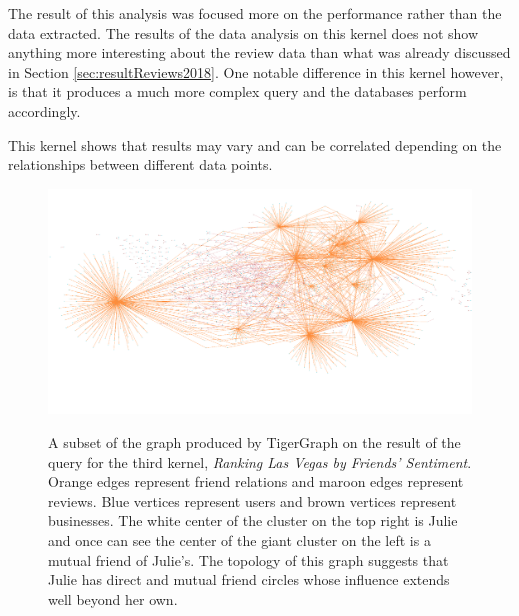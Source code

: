 The result of this analysis was focused more on the performance rather than the data extracted. The results of the data analysis on this kernel does not show anything more interesting about the review data than what was already discussed in Section \ref{sec:resultReviews2018}. One notable difference in this kernel however, is that it produces a much more complex query and the databases perform accordingly.

This kernel shows that results may vary and can be correlated depending on the relationships between different data points.

\begin{figure}[h]
    \centering
    \begin{mdframed}[backgroundcolor=gray!70!white, style=GraphFrame]
    {\includegraphics[width=\textwidth]{img/7_graphs/julieBusinesses.png}}
    \end{mdframed}
    \caption{A subset of the graph produced by TigerGraph on the result of the query for the third kernel, \emph{Ranking Las Vegas by Friends’ Sentiment}. Orange edges represent friend relations and maroon edges represent reviews. Blue vertices represent users and brown vertices represent businesses. The white center of the cluster on the top right is Julie and once can see the center of the giant cluster on the left is a mutual friend of Julie's. The topology of this graph suggests that Julie has direct and mutual friend circles whose influence extends well beyond her own.}
    \label{fig:cityGraph}
\end{figure}

